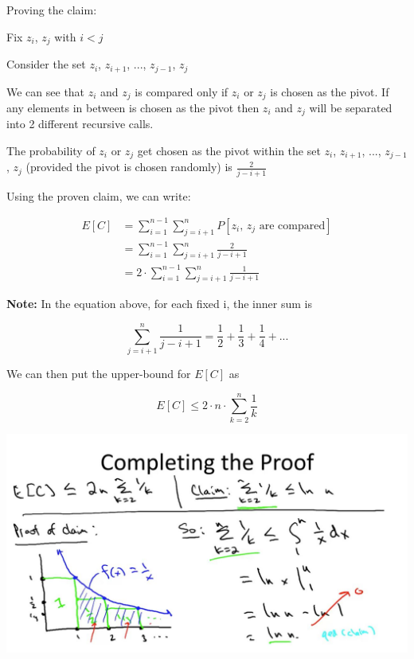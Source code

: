 \documentclass{article}
\begin{document}
\bigskip

\noindent Proving the claim:

\bigskip

\noindent Fix $z_i$, $z_j$ with $i < j$

\bigskip

\noindent Consider the set $z_i$, $z_{i+1}$, ..., $z_{j-1}$, $z_j$

\bigskip

\noindent We can see that $z_i$ and $z_j$ is compared only if $z_i$ or $z_j$ is chosen as the pivot. If any elements in between is chosen as the pivot then $z_i$ and $z_j$ will be separated into 2 different recursive calls.

\bigskip

\noindent The probability of $z_i$ or $z_j$ get chosen as the pivot within the set $z_i$, $z_{i+1}$, ..., $z_{j-1}$, $z_j$ (provided the pivot is chosen randomly) is $\frac{2}{j - i + 1}$

\bigskip

\noindent Using the proven claim, we can write:

\begin{equation*}
\begin{split}
E[C] & = \sum_{i=1}^{n-1} \sum_{j=i+1}^{n} P[z_i \text{, } z_j \text{ are compared}] \\
     & = \sum_{i=1}^{n-1} \sum_{j=i+1}^{n} \frac{2}{j - i + 1} \\
     & = 2 \cdot \sum_{i=1}^{n-1} \sum_{j=i+1}^{n} \frac{1}{j - i + 1}
\end{split}
\end{equation*}


\bigskip

\noindent \textbf{Note:} In the equation above, for each fixed i, the inner sum is

\begin{equation*}
\sum_{j=i+1}^{n} \frac{1}{j - i + 1} = \frac{1}{2} + \frac{1}{3} + \frac{1}{4} + ...
\end{equation*}

\bigskip

\noindent We can then put the upper-bound for $E[C]$ as

\begin{equation*}
E[C] \leq 2 \cdot n \cdot \sum_{k=2}^{n} \frac{1}{k}
\end{equation*}

\bigskip

\centering
\includegraphics[width=\textwidth]{proof}
\end{document}
